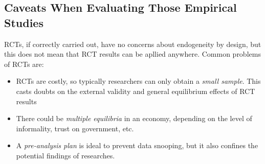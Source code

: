     \subsection{Caveats When Evaluating Those Empirical Studies}
        RCTs, if correctly carried out, have no concerns about endogeneity by design, but this does not mean that RCT results can be apllied anywhere. Common problems of RCTs are:
        \begin{itemize}
            \item RCTs are costly, so typically researchers can only obtain a \emph{small sample}. This casts doubts on the external validity and general equilibrium effects of RCT results
            \item There could be \emph{multiple equilibria} in an economy, depending on the level of informality, trust on government, etc.
            \item A \emph{pre-analysis plan} is ideal to prevent data snooping, but it also confines the potential findings of researches.
        \end{itemize}
